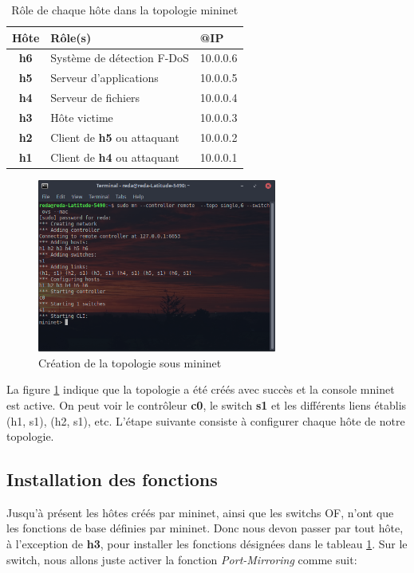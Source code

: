 \begin{table}[H]
\begin{center}
\begin{tabular}{  | c || m{5cm} | m{3cm} | }
\hline
\rowcolor[rgb]{0.85,0.85,0.85}
Hôte & Rôle(s) & @IP\\
\hline
\textbf{h6} & Système de détection F-DoS & 10.0.0.6\\
\hline
\textbf{h5} & Serveur d'applications & 10.0.0.5\\
\hline
\textbf{h4} & Serveur de fichiers & 10.0.0.4\\
\hline
\textbf{h3} & Hôte victime & 10.0.0.3\\
\hline
\textbf{h2} & Client de \textbf{h5} ou attaquant & 10.0.0.2\\
\hline
\textbf{h1} & Client de \textbf{h4} ou attaquant & 10.0.0.1\\
\hline
\end{tabular}
\caption{Rôle de chaque hôte dans la topologie mininet}
\label{table:nodes}
\end{center}
\end{table}

\begin{figure}[H]
\centering
\includegraphics[width=0.7\textwidth]{Figures/simulation/mininet/start}
\decoRule
\caption{Création de la topologie sous mininet}
\label{fig:topologie}
\end{figure}

La figure \ref{fig:topologie} indique que la topologie a été créés avec succès et la console mninet est active. On peut voir le contrôleur \textbf{c0}, le switch \textbf{s1} et les différents liens établis (h1, s1), (h2, s1), etc. L'étape suivante consiste à configurer chaque hôte de notre topologie.

\subsection{Installation des fonctions}
Jusqu'à présent les hôtes créés par mininet, ainsi que les switchs OF, n'ont que les fonctions de base définies par mininet. Donc nous devon passer par tout hôte, à l'exception de \textbf{h3}, pour installer les fonctions désignées dans le tableau \ref{table:nodes}. Sur le switch, nous allons juste activer la fonction \textit{Port-Mirroring} comme suit:

